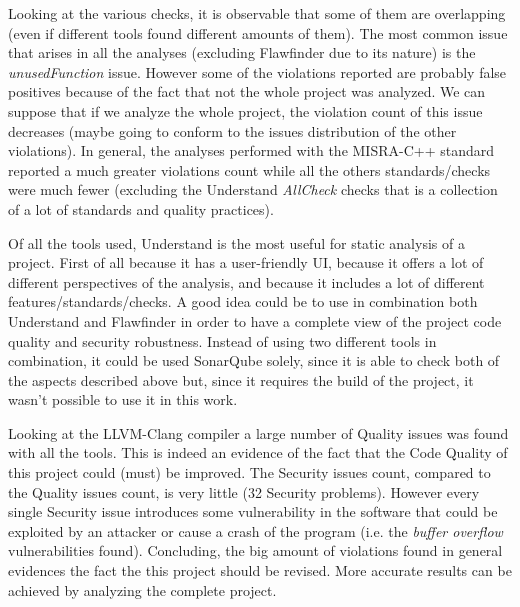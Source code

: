 Looking at the various checks, it is observable that some of them are overlapping (even if different tools found different amounts of them). The most common issue that arises in all the analyses (excluding Flawfinder due to its nature) is the \textsl{unusedFunction} issue. However some of the violations reported are probably false positives because of the fact that not the whole project was analyzed. We can suppose that if we analyze the whole project, the violation count of this issue decreases (maybe going to conform to the issues distribution of the other violations).\newline
In general, the analyses performed with the MISRA-C++ standard reported a much greater violations count while all the others standards/checks were much fewer (excluding the Understand \textsl{AllCheck} checks that is a collection of a lot of standards and quality practices).\newline\newline

Of all the tools used, Understand is the most useful for static analysis of a project. First of all because it has a user-friendly UI, because it offers a lot of different perspectives of the analysis, and because it includes a lot of different features/standards/checks.\newline
A good idea could be to use in combination both Understand and Flawfinder in order to have a complete view of the project code quality and security robustness.\newline
Instead of using two different tools in combination, it could be used SonarQube solely, since it is able to check both of the aspects described above but, since it requires the build of the project, it wasn't possible to use it in this work.\newline\newline

Looking at the LLVM-Clang compiler a large number of Quality issues was found with all the tools. This is indeed an evidence of the fact that the Code Quality of this project could (must) be improved.\newline
The Security issues count, compared to the Quality issues count, is very little (32 Security problems). However every single Security issue introduces some vulnerability in the software that could be exploited by an attacker or cause a crash of the program (i.e. the \textsl{buffer overflow} vulnerabilities found).\newline
Concluding, the big amount of violations found in general evidences the fact the this project should be revised. More accurate results can be achieved by analyzing the complete project.